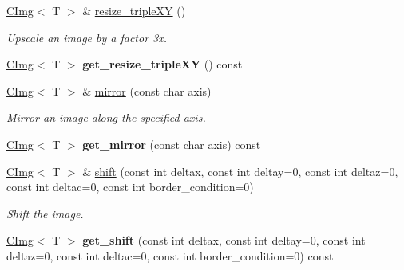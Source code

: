 \begin{DoxyCompactItemize}
\item 
\hyperlink{structcimg__library_1_1CImg}{CImg}$<$ T $>$ \& \hyperlink{structcimg__library_1_1CImg_a64f4be91725b57a74d080b848660676c}{resize\_\-tripleXY} ()
\begin{DoxyCompactList}\small\item\em Upscale an image by a factor 3x. \item\end{DoxyCompactList}\item 
\hypertarget{structcimg__library_1_1CImg_a83cf33bb78a93d22c12a8ee98b87eff6}{
\hyperlink{structcimg__library_1_1CImg}{CImg}$<$ T $>$ {\bfseries get\_\-resize\_\-tripleXY} () const }
\label{structcimg__library_1_1CImg_a83cf33bb78a93d22c12a8ee98b87eff6}

\item 
\hypertarget{structcimg__library_1_1CImg_a91a5e5fd9431ca28eaeee0ea03419ab0}{
\hyperlink{structcimg__library_1_1CImg}{CImg}$<$ T $>$ \& \hyperlink{structcimg__library_1_1CImg_a91a5e5fd9431ca28eaeee0ea03419ab0}{mirror} (const char axis)}
\label{structcimg__library_1_1CImg_a91a5e5fd9431ca28eaeee0ea03419ab0}

\begin{DoxyCompactList}\small\item\em Mirror an image along the specified axis. \item\end{DoxyCompactList}\item 
\hypertarget{structcimg__library_1_1CImg_aa7e35cf53e3084ee8faa33cef63a36b8}{
\hyperlink{structcimg__library_1_1CImg}{CImg}$<$ T $>$ {\bfseries get\_\-mirror} (const char axis) const }
\label{structcimg__library_1_1CImg_aa7e35cf53e3084ee8faa33cef63a36b8}

\item 
\hyperlink{structcimg__library_1_1CImg}{CImg}$<$ T $>$ \& \hyperlink{structcimg__library_1_1CImg_a5926c1125a424785932d3dc1ea71d0bd}{shift} (const int deltax, const int deltay=0, const int deltaz=0, const int deltac=0, const int border\_\-condition=0)
\begin{DoxyCompactList}\small\item\em Shift the image. \item\end{DoxyCompactList}\item 
\hypertarget{structcimg__library_1_1CImg_a4c0f0c444e228448eefd8da449151e8a}{
\hyperlink{structcimg__library_1_1CImg}{CImg}$<$ T $>$ {\bfseries get\_\-shift} (const int deltax, const int deltay=0, const int deltaz=0, const int deltac=0, const int border\_\-condition=0) const }
\label{structcimg__library_1_1CImg_a4c0f0c444e228448eefd8da449151e8a}


\end{DoxyCompactItemize}
